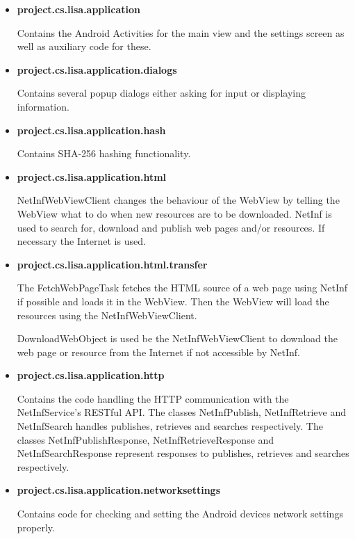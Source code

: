\begin{itemize}
	\item{\bf project.cs.lisa.application}
	
	Contains the Android Activities for the main view and the settings screen as well as auxiliary code for these.
	
	\item{\bf project.cs.lisa.application.dialogs}

	Contains several popup dialogs either asking for input or displaying information.
	
	\item{\bf project.cs.lisa.application.hash}
	
	Contains SHA-256 hashing functionality.
	
	\item{\bf project.cs.lisa.application.html}
	
	NetInfWebViewClient changes the behaviour of the WebView by telling the WebView what to do when new resources are to be downloaded. NetInf is used to search for, download and publish web pages and/or resources. If necessary the Internet is used.
	
	\item{\bf project.cs.lisa.application.html.transfer}
	
	The FetchWebPageTask fetches the HTML source of a web page using NetInf if possible and loads it in the WebView. Then the WebView will load the resources using the NetInfWebViewClient.
	
DownloadWebObject is used be the NetInfWebViewClient to download the web page or resource from the Internet if not accessible by NetInf.
	
	\item{\bf project.cs.lisa.application.http}
	
	Contains the code handling the HTTP communication with the NetInfService's RESTful API. The classes NetInfPublish, NetInfRetrieve and NetInfSearch handles publishes, retrieves and searches respectively. The classes NetInfPublishResponse, NetInfRetrieveResponse and NetInfSearchResponse represent responses to publishes, retrieves and searches respectively.
	
	\item{\bf project.cs.lisa.application.networksettings}
	
	Contains code for checking and setting the Android devices network settings properly.
	
\end{itemize}

